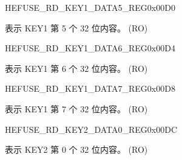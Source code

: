 \begin{register}{H}{EFUSE\_RD\_KEY1\_DATA5\_REG}{0x00D0}\label{regdesc:EFUSERDKEY1DATA5REG}
%
\regnewline%
\begin{regdesc}\begin{reglist}
\label{fielddesc:EFUSEKEY1DATA5}\item [EFUSE\_KEY1\_DATA5] 表示 KEY1 第 5 个 32 位内容。 (RO)
\end{reglist}\end{regdesc}
\end{register}


\begin{register}{H}{EFUSE\_RD\_KEY1\_DATA6\_REG}{0x00D4}\label{regdesc:EFUSERDKEY1DATA6REG}
%
\regnewline%
\begin{regdesc}\begin{reglist}
\label{fielddesc:EFUSEKEY1DATA6}\item [EFUSE\_KEY1\_DATA6] 表示 KEY1 第 6 个 32 位内容。 (RO)
\end{reglist}\end{regdesc}
\end{register}


\begin{register}{H}{EFUSE\_RD\_KEY1\_DATA7\_REG}{0x00D8}\label{regdesc:EFUSERDKEY1DATA7REG}
%
\regnewline%
\begin{regdesc}\begin{reglist}
\label{fielddesc:EFUSEKEY1DATA7}\item [EFUSE\_KEY1\_DATA7] 表示 KEY1 第 7 个 32 位内容。 (RO)
\end{reglist}\end{regdesc}
\end{register}


\begin{register}{H}{EFUSE\_RD\_KEY2\_DATA0\_REG}{0x00DC}\label{regdesc:EFUSERDKEY2DATA0REG}
%
\regnewline%
\begin{regdesc}\begin{reglist}
\label{fielddesc:EFUSEKEY2DATA0}\item [EFUSE\_KEY2\_DATA0] 表示 KEY2 第 0 个 32 位内容。 (RO)
\end{reglist}\end{regdesc}
\end{register}



